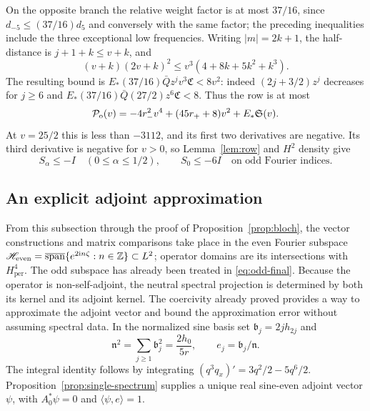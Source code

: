 \documentclass[a4paper,11pt]{article}
\numberwithin{equation}{section}
\theoremstyle{definition}
\theoremstyle{remark}
\newcommand{\Z}{\mathbb Z}
\newcommand{\ii}{\mathrm i}
\newcommand{\per}{\mathrm{per}}
\newcommand{\ip}[2]{\langle#1,#2\rangle}
\begin{document}
On the opposite branch the relative weight factor is at most $37/16$, since $d_{-5}\le(37/16)d_5$ and conversely with the same factor; the preceding inequalities include the three exceptional low frequencies. Writing $|m|=2k+1$, the half-distance is $j+1+k\le v+k$, and
\[
 (v+k)(2v+k)^2\le v^3(4+8k+5k^2+k^3).
\]
The resulting bound is $E_*(37/16)\bar Qz^jv^3\mathfrak C<8v^2$: indeed $(2j+3/2)z^j$ decreases for $j\ge6$ and $E_*(37/16)\bar Q(27/2)z^6\mathfrak C<8$. Thus the row is at most
\begin{equation}\label{eq:odd-high}
 \mathcal P_{\rm o}(v)=-4r_-^2v^4+(45r_++8)v^2+E_*\mathfrak S(v).
\end{equation}
At $v=25/2$ this is less than $-3112$, and its first two derivatives are negative. Its third derivative is negative for $v>0$, so Lemma~\ref{lem:row} and $H^2$ density give
\begin{equation}\label{eq:odd-final}
 S_\alpha\le-I\quad(0\le\alpha\le1/2),\qquad S_0\le-6I
 \quad\text{on odd Fourier indices}.
\end{equation}

\subsection{An explicit adjoint approximation}
From this subsection through the proof of Proposition~\ref{prop:bloch}, the vector constructions and matrix comparisons take place in the even Fourier subspace $\mathscr H_{\rm even}=\overline{\operatorname{span}}\{e^{2\ii n\zeta}:n\in\Z\}\subset L^2$; operator domains are its intersections with $H^4_\per$. The odd subspace has already been treated in \eqref{eq:odd-final}. Because the operator is non-self-adjoint, the neutral spectral projection is determined by both its kernel and its adjoint kernel. The coercivity already proved provides a way to approximate the adjoint vector and bound the approximation error without assuming spectral data.
In the normalized sine basis set $\mathfrak b_j=2jh_{2j}$ and
\begin{equation}\label{eq:kernel-norm}
 \mathfrak n^2=\sum_{j\ge1}\mathfrak b_j^2=\frac{2h_0}{5r},\qquad
 e_j=\mathfrak b_j/\mathfrak n.
\end{equation}
The integral identity follows by integrating $(q^3q_x)'=3q^2/2-5q^6/2$. Proposition~\ref{prop:single-spectrum} supplies a unique real sine-even adjoint vector $\psi$, with $A_0^*\psi=0$ and $\ip\psi e=1$.
\end{document}
